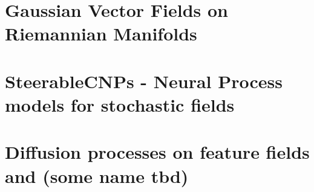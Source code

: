 \documentclass[11pt]{book}
\begin{document}
\chapter{Gaussian Vector Fields on Riemannian Manifolds}


\chapter{SteerableCNPs - Neural Process models for stochastic fields}


\chapter{Diffusion processes on feature fields and (some name tbd)}

\end{document}
